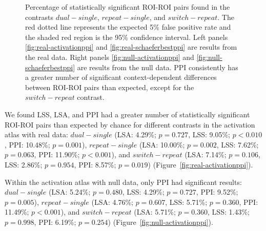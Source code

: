 \documentclass[phd,figures,tables,ackpage,abstractpage,publicabstractpage]{uithesis}
\begin{document}
\begin{figure}[H]
  \centering
  \hfill
  \vfill
  \hfill
  \caption[Comparison of LSA/LSS/PPI using participant data]{
    Percentage of statistically significant ROI-ROI pairs found
    in the contrasts $dual - single$, $repeat - single$, and
    $switch - repeat$.
    The red dotted line represents the expected 5\% false positive rate
    and the shaded red region is the 95\% confidence interval.
    Left panels \ref{fig:real-activationppi} and \ref{fig:real-schaeferbestppi}
    are results from the real data.
    Right panels \ref{fig:null-activationppi} and \ref{fig:null-schaeferbestppi} are results
    from the null data.
    PPI consistently has a greater number of significant context-dependent differences between ROI-ROI pairs
    than expected, except for the $switch - repeat$ contrast.
  }
\label{fig:main-resultppi}
\end{figure}

We found LSS, LSA, and PPI had a greater number of statistically significant ROI-ROI pairs than expected by chance
for different contrasts in the activation atlas with real data: $dual - single$ (LSA: 4.29\%; $p = 0.727$,
LSS: 9.05\%; $p < 0.010$, PPI: 10.48\%; $p = 0.001$),
$repeat - single$ (LSA: 10.00\%; $p = 0.002$, LSS: 7.62\%; $p = 0.063$, PPI: 11.90\%; $p < 0.001$), and
$switch - repeat$ (LSA: 7.14\%; $p = 0.106$, LSS: 2.86\%; $p = 0.954$, PPI: 8.57\%; $p = 0.019$) (Figure~\ref{fig:real-activationppi}).

Within the activation atlas with null data, only PPI had significant results:
$dual - single$ (LSA: 5.24\%; $p = 0.480$, LSS: 4.29\%; $p = 0.727$, PPI: 9.52\%; $p = 0.005$),
$repeat - single$ (LSA: 4.76\%; $p = 0.607$, LSS: 5.71\%; $p = 0.360$, PPI: 11.49\%; $p < 0.001$), and
$switch - repeat$ (LSA: 5.71\%; $p = 0.360$, LSS: 1.43\%; $p = 0.998$, PPI: 6.19\%; $p = 0.254$) (Figure~\ref{fig:null-activationppi}).
\end{document}
